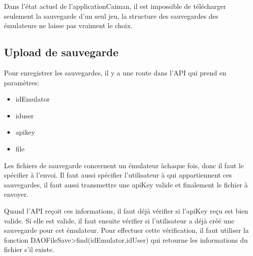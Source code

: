 \documentclass[a4paper,12pt,french]{sphinxmanual}
\begin{document}
\sphinxAtStartPar
Dans l’état actuel de l’applicationCaiman, il est impossible de télécharger seulement la sauvegarde d’un seul jeu, la structure des sauvegardes des émulateurs ne laisse pas vraiment le choix.


\subsection{Upload de sauvegarde}
\label{\detokenize{organique:upload-de-sauvegarde}}
\sphinxAtStartPar
Pour enregistrer les sauvegardes, il y a une route dans l’API qui prend en paramètres:
\begin{itemize}
\item {} 
\sphinxAtStartPar
idEmulator

\item {} 
\sphinxAtStartPar
iduser

\item {} 
\sphinxAtStartPar
apikey

\item {} 
\sphinxAtStartPar
file

\end{itemize}

\sphinxAtStartPar
Les fichiers de sauvegarde concernent un émulateur àchaque fois, donc il faut le spécifier à l’envoi. Il faut aussi spécifier l’utilisateur à qui appartiennent ces sauvegardes, il faut aussi transmettre une apiKey valide et finalement le fichier à envoyer.

\sphinxAtStartPar
Quand l’API reçoit ces informations, il faut déjà vérifier si l’apiKey reçu est bien valide. Si elle est valide, il faut ensuite vérifier si l’utilisateur a déjà créé une sauvegarde pour cet émulateur. Pour effectuer cette vérification, il faut utiliser la fonction DAOFileSave\sphinxhyphen{}>find(idEmulator,idUser) qui retourne les informations du fichier s’il existe.
\end{document}
